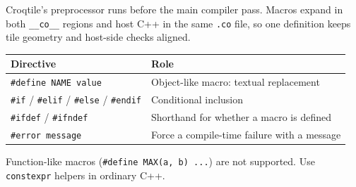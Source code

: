 Croqtile's preprocessor runs before the main compiler pass. Macros expand in both \texttt{\_\_co\_\_} regions and host C++ in the same \texttt{.co} file, so one definition keeps tile geometry and host-side checks aligned.

\begin{table}[htbp]
\centering\small
\begin{tabularx}{\linewidth}{@{}lX@{}}
\toprule
\textbf{Directive} & \textbf{Role} \\
\midrule
\texttt{\#\allowbreak{}define NAME value} & Object-like macro: textual replacement \\
\texttt{\#if} / \texttt{\#elif} / \texttt{\#else} / \texttt{\#endif} & Conditional inclusion \\
\texttt{\#ifdef} / \texttt{\#ifndef} & Shorthand for whether a macro is defined \\
\texttt{\#\allowbreak{}error message} & Force a compile-time failure with a message \\
\bottomrule
\end{tabularx}
\end{table}

Function-like macros (\texttt{\#\allowbreak{}define MAX(a, b) .\allowbreak{}.\allowbreak{}.\allowbreak{}}) are not supported. Use \texttt{constexpr} helpers in ordinary C++.
